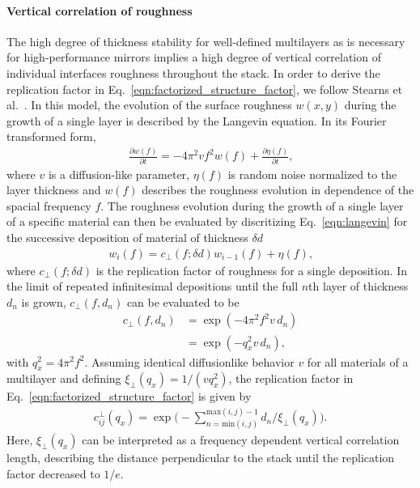 \paragraph{Vertical correlation of roughness}
The high degree of thickness stability for well-defined multilayers as is necessary for high-performance mirrors implies a high degree of vertical correlation of individual interfaces roughness throughout the stack. In order to derive the replication factor in Eq.~\eqref{eqn:factorized_structure_factor}, we follow Stearns et al.~\cite{stearns_x-ray_1992}. In this model, the evolution of the surface roughness $w(x,y)$ during the growth of a single layer is described by the Langevin equation. In its Fourier transformed form, 
\begin{align}
\frac{\partial w(f)}{\partial t} = - 4 \pi^2 v f^2 w(f) + \frac{\partial \eta(f)}{\partial t} \text{,} \label{eqn:langevin}
\end{align}
where $v$ is a diffusion-like parameter, $\eta(f)$ is random noise normalized to the layer thickness and $w(f)$ describes the roughness evolution in dependence of the spacial frequency $f$. The roughness evolution during the growth of a single layer of a specific material can then be evaluated by discritizing Eq.~\eqref{eqn:langevin} for the successive deposition of material of thickness $\delta d$
\begin{align}
w_i(f) = c_\perp(f;\delta d) w_{i-1}(f) + \eta(f) \text{,}
\end{align}
where $c_\perp(f;\delta d)$ is the replication factor of roughness for a single deposition. In the limit of repeated infinitesimal depositions until the full $n$th layer of thickness $d_n$ is grown, $c_\perp(f,d_n)$ can be evaluated to be \cite{spiller1993multilayer}
\begin{align}
    c_\perp(f,d_n) &= \exp(-4\pi^2 f^2 v \,d_n) \nonumber \\
                   &= \exp(-q_x^2 v \,d_n)\text{,}
\end{align}
with $q_x^2 = 4 \pi^2 f^2$. Assuming identical diffusionlike behavior $v$ for all materials of a multilayer and defining $\xi_\perp(q_x) = 1/(v q_x^2)$, the replication factor in Eq.~\eqref{eqn:factorized_structure_factor} is given by
\begin{align}
c_{ij}^\perp(q_x) =  \exp\Bigg(-\sum \limits_{n = \text{min}(i,j)}^{\text{max}(i,j)-1}d_n/\xi_\perp(q_x) \Bigg)\text{.}
\end{align}
Here, $\xi_\perp(q_x)$ can be interpreted as a frequency dependent vertical correlation length, describing the distance perpendicular to the stack until the replication factor decreased to $1/e$.

